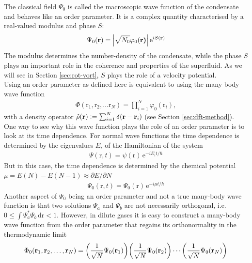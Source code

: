 \documentclass[12pt,a4paper]{book}
\renewcommand{\vec}[1]{\bm{\mathrm{#1}}}
\newcommand{\unit}[1]{\,\mathrm{#1}}
\begin{document}
			The classical field $\Psi_0$ is called the macroscopic wave function of the condensate and behaves like an order parameter. It is a complex quantity characterised by a real-valued modulus and phase $S$:
			\begin{align}
				\Psi_0(\vec{r}) = \absolutevalue{\sqrt{N_0}\varphi_0(\vec{r)}}\,\mathrm{e}^{iS(\vec{r})}\label{eq:order-param-complex}
			\end{align}
			The modulus determines the number-density of the condensate, while the phase $S$ plays an important role in the coherence and properties of the superfluid. As we will see in Section \ref{sec:rot-vort}, $S$ plays the role of a velocity potential.\\
			
			Using an order parameter as defined here is equivalent to using the many-body wave function
			\begin{align}
				\Phi(\vec{r}_1,\vec{r}_2,\ldots\vec{r}_N)=\prod_{i=1}^{N}\varphi_0(\vec{r}_i),
			\end{align}
			with a density operator $\hat{\rho}(\vec{r}) \vcentcolon= \sum_{i=1}^{N}\delta(\vec{r}-\vec{r}_i)$ (see Section \ref{sec:dft-method}). One way to see why this wave function plays the role of an order parameter is to look at its time dependence. For normal wave functions the time dependence is determined by the eigenvalues $E_i$ of the Hamiltonian of the system
			\begin{align}
				\Psi(\vec{r},t)=\psi(\vec{r})\,\mathrm{e}^{-iE_it/\hbar}
			\end{align}
			But in this case, the time dependence is determined by the chemical potential $\mu=E(N)-E(N-1)\approx \partial E/\partial N$
			\begin{align}
				\Psi_0(\vec{r},t)=\Psi_0(\vec{r})\,\mathrm{e}^{-i\mu t/\hbar}
			\end{align}
			Another aspect of $\Psi_0$ being an order parameter and not a true many-body wave function is that two solutions $\Psi_a$ and $\Psi_b$ are not necessarily orthogonal, i.e. $0 \leq \int\!\Psi_a^*\Psi_b\unit{d}\vec{r} < 1$. However, in dilute gases it is easy to construct a many-body wave function from the order parameter that regains its orthonormality in the thermodynamic limit
			\begin{align}
				\Phi_0(\vec{r}_1,\vec{r}_2,\ldots,\vec{r}_N) = \qty(\frac{1}{\sqrt{N}}\Psi_0(\vec{r}_1))\qty(\frac{1}{\sqrt{N}}\Psi_0(\vec{r}_2))\cdots\qty(\frac{1}{\sqrt{N}}\Psi_0(\vec{r}_N))
			\end{align}
			
\end{document}
